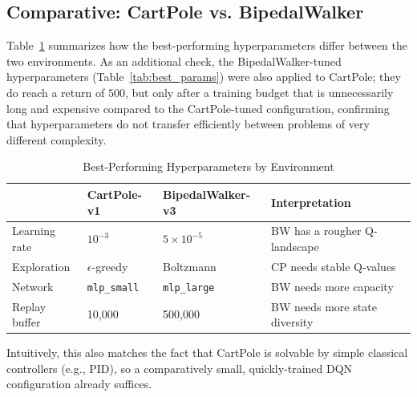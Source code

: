 \subsection{Comparative: CartPole vs. BipedalWalker}
Table~\ref{tab:comparative} summarizes how the best-performing hyperparameters differ between the two environments. As an additional check, the BipedalWalker-tuned hyperparameters (Table~\ref{tab:best_params}) were also applied to CartPole; they do reach a return of $500$, but only after a training budget that is unnecessarily long and expensive compared to the CartPole-tuned configuration, confirming that hyperparameters do not transfer efficiently between problems of very different complexity.

\begin{table}[!ht]
    \centering
    \footnotesize
    \caption{Best-Performing Hyperparameters by Environment}
    \label{tab:comparative}
    \begin{tabular}{llll}
        \toprule
         & CartPole-v1 & BipedalWalker-v3 & Interpretation \\
        \midrule
        Learning rate & $10^{-3}$ & $5{\times}10^{-5}$ & BW has a rougher Q-landscape \\
        Exploration & $\epsilon$-greedy & Boltzmann & CP needs stable Q-values \\
        Network & \texttt{mlp\_small} & \texttt{mlp\_large} & BW needs more capacity \\
        Replay buffer & 10,000 & 500,000 & BW needs more state diversity \\
        \bottomrule
    \end{tabular}
\end{table}

Intuitively, this also matches the fact that CartPole is solvable by simple classical controllers (e.g., PID), so a comparatively small, quickly-trained DQN configuration already suffices.

